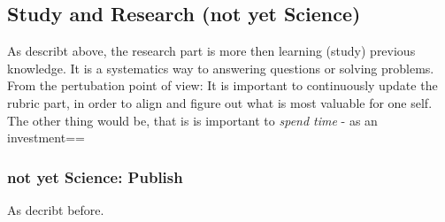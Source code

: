  
 
 \subsection{Study and Research (not yet Science)}
 
 As describt above, the research part is more then learning (study) previous knowledge. It is  a systematics way to answering questions or solving problems.\\ 
 
 From the pertubation point of view: It is important to continuously update the rubric part, in order to align and figure out what is most valuable for one self.\\
 
 The other thing would be, that is is important to \textit{spend time} - as an investment==
 
 \subsubsection{not yet Science: Publish}
 As decribt before.
 
